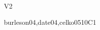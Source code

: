 \begin{syllabus}
\begin{competences}{V2}
    \item {} 
    \item {}
    \item {}
\end{competences}

\begin{unit}{\IMPhysicalDatabaseDesign}{}{burleson04,date04,celko05}{10}{C1}
\begin{topics}%
      \item \IMPhysicalDatabaseDesignTopicStorage
      \item \IMPhysicalDatabaseDesignTopicIndexed
      \item \IMPhysicalDatabaseDesignTopicHashed
      \item \IMPhysicalDatabaseDesignTopicSignature
      \item \IMPhysicalDatabaseDesignTopicB
      \item \IMPhysicalDatabaseDesignTopicFiles
      \item \IMPhysicalDatabaseDesignTopicFilesWith
      \item \IMPhysicalDatabaseDesignTopicDatabase
\end{topics}
\begin{learningoutcomes}
	\item \IMPhysicalDatabaseDesignLOExplainTheRecords [\Usage]
	\item \IMPhysicalDatabaseDesignLOGiveExamples [\Usage]
	\item \IMPhysicalDatabaseDesignLODistinguish [\Usage]
	\item \IMPhysicalDatabaseDesignLOImplementDynamic [\Usage]
	\item \IMPhysicalDatabaseDesignLOExplainTheApplication [\Usage]
	\item \IMPhysicalDatabaseDesignLOUseHashing [\Usage]
	\item \IMPhysicalDatabaseDesignLODescribeTheHashing [\Usage]
	\item \IMPhysicalDatabaseDesignLOEvaluateCosts [\Usage]
	\item \IMPhysicalDatabaseDesignLOExplainHowDesignTransaction [\Usage]
\end{learningoutcomes}
\end{unit}


\end{syllabus}

